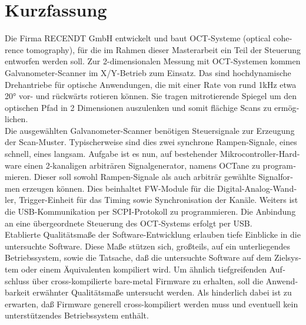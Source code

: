 \chapter{Kurzfassung}

\begin{german}
Die Firma RECENDT GmbH entwickelt und baut OCT-Systeme (optical coherence tomography), für die im Rahmen dieser Masterarbeit ein Teil der Steuerung entworfen werden soll. Zur 2-dimensionalen Messung mit OCT-Systemen kommen Galvanometer-Scanner im X/Y-Betrieb zum Einsatz. Das sind hochdynamische Drehantriebe für optische Anwendungen, die mit einer Rate von rund 1kHz etwa 20° vor- und rückwärts rotieren können. Sie tragen mitrotierende Spiegel um den optischen Pfad in 2 Dimensionen auszulenken und somit flächige Scans zu ermöglichen. \\

Die ausgewählten Galvanometer-Scanner benötigen Steuersignale zur Erzeugung der Scan-Muster. Typischerweise sind dies zwei synchrone Rampen-Signale, eines schnell, eines langsam. Aufgabe ist es nun, auf bestehender Mikrocontroller-Hardware einen 2-kanaligen arbiträren Signalgenerator, namens OCTane zu programmieren. Dieser soll sowohl Rampen-Signale als auch arbiträr gewählte Signalformen erzeugen können. Dies beinhaltet FW-Module für die Digital-Analog-Wandler, Trigger-Einheit für das Timing sowie Synchronisation der Kanäle. Weiters ist die USB-Kommunikation per SCPI-Protokoll zu programmieren. Die Anbindung an eine übergeordnete Steuerung des OCT-Systems erfolgt per USB. \\

Etablierte Qualitätsmaße der Software-Entwicklung erlauben tiefe Einblicke in die untersuchte Software. Diese Maße stützen sich, großteils, auf ein unterliegendes Betriebssystem, sowie die Tatsache, daß die untersuchte Software auf dem Zielsystem oder einem Äquivalenten kompiliert wird. Um ähnlich tiefgreifenden Aufschluss über cross-kompilierte bare-metal Firmware zu erhalten, soll die Anwendbarkeit erwähnter Qualitätsmaße untersucht werden. Als hinderlich dabei ist zu erwarten, daß Firmware generell cross-kompiliert werden muss und eventuell kein unterstützendes Betriebssystem enthält.

\end{german}